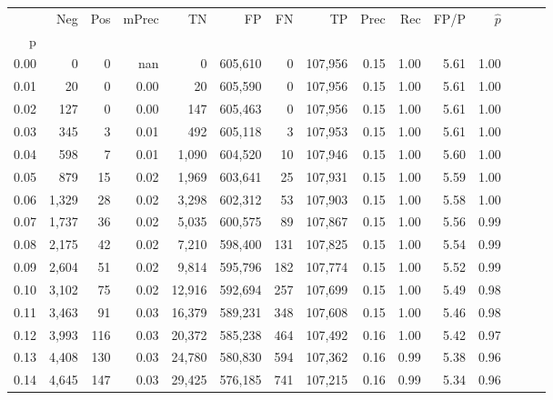 \begin{tabular}{rrrrrrrrrrrrrrr}
\toprule
{} &     Neg &    Pos & mPrec &       TN &       FP &       FN &       TP &  Prec &   Rec &  FP/P & $\hat{p}$ \\
p    &         &        &       &          &          &          &          &       &       &       &           \\
\midrule
0.00 &       0 &      0 &   nan &        0 &  605,610 &        0 &  107,956 &  0.15 &  1.00 &  5.61 &      1.00 \\
0.01 &      20 &      0 &  0.00 &       20 &  605,590 &        0 &  107,956 &  0.15 &  1.00 &  5.61 &      1.00 \\
0.02 &     127 &      0 &  0.00 &      147 &  605,463 &        0 &  107,956 &  0.15 &  1.00 &  5.61 &      1.00 \\
0.03 &     345 &      3 &  0.01 &      492 &  605,118 &        3 &  107,953 &  0.15 &  1.00 &  5.61 &      1.00 \\
0.04 &     598 &      7 &  0.01 &    1,090 &  604,520 &       10 &  107,946 &  0.15 &  1.00 &  5.60 &      1.00 \\
0.05 &     879 &     15 &  0.02 &    1,969 &  603,641 &       25 &  107,931 &  0.15 &  1.00 &  5.59 &      1.00 \\
0.06 &   1,329 &     28 &  0.02 &    3,298 &  602,312 &       53 &  107,903 &  0.15 &  1.00 &  5.58 &      1.00 \\
0.07 &   1,737 &     36 &  0.02 &    5,035 &  600,575 &       89 &  107,867 &  0.15 &  1.00 &  5.56 &      0.99 \\
0.08 &   2,175 &     42 &  0.02 &    7,210 &  598,400 &      131 &  107,825 &  0.15 &  1.00 &  5.54 &      0.99 \\
0.09 &   2,604 &     51 &  0.02 &    9,814 &  595,796 &      182 &  107,774 &  0.15 &  1.00 &  5.52 &      0.99 \\
0.10 &   3,102 &     75 &  0.02 &   12,916 &  592,694 &      257 &  107,699 &  0.15 &  1.00 &  5.49 &      0.98 \\
0.11 &   3,463 &     91 &  0.03 &   16,379 &  589,231 &      348 &  107,608 &  0.15 &  1.00 &  5.46 &      0.98 \\
0.12 &   3,993 &    116 &  0.03 &   20,372 &  585,238 &      464 &  107,492 &  0.16 &  1.00 &  5.42 &      0.97 \\
0.13 &   4,408 &    130 &  0.03 &   24,780 &  580,830 &      594 &  107,362 &  0.16 &  0.99 &  5.38 &      0.96 \\
0.14 &   4,645 &    147 &  0.03 &   29,425 &  576,185 &      741 &  107,215 &  0.16 &  0.99 &  5.34 &      0.96 \\

\end{tabular}
